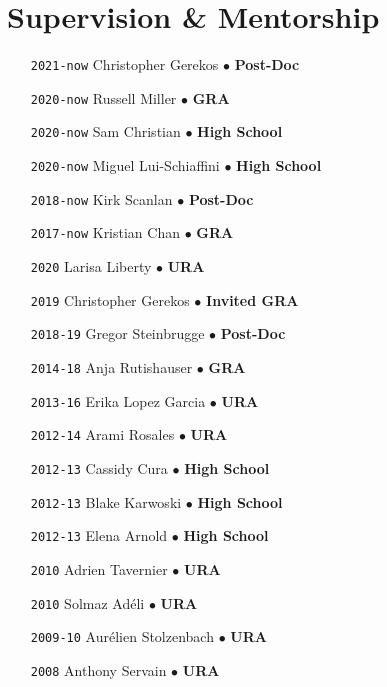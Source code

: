 \section*{Supervision \& Mentorship}

\begin{itemize}[leftmargin=5.8em, labelsep=1.5em]
\setlength\itemsep{-.5em}
    \item[\texttt{2021-now}] Christopher Gerekos $\bullet$ \textbf{Post-Doc}
    \item[\texttt{2020-now}] Russell Miller $\bullet$ \textbf{GRA}
    \item[\texttt{2020-now}] Sam Christian $\bullet$ \textbf{High School}
    \item[\texttt{2020-now}] Miguel Lui-Schiaffini $\bullet$ \textbf{High School}
    \item[\texttt{2018-now}] Kirk Scanlan $\bullet$ \textbf{Post-Doc}
    \item[\texttt{2017-now}] Kristian Chan $\bullet$ \textbf{GRA}
    \item[\texttt{2020}] Larisa Liberty $\bullet$ \textbf{URA}
    \item[\texttt{2019}] Christopher Gerekos $\bullet$ \textbf{Invited GRA}
    \item[\texttt{2018-19}] Gregor Steinbrugge $\bullet$ \textbf{Post-Doc}
    \item[\texttt{2014-18}] Anja Rutishauser $\bullet$ \textbf{GRA}
    \item[\texttt{2013-16}] Erika Lopez Garcia $\bullet$ \textbf{URA}
    \item[\texttt{2012-14}] Arami Rosales $\bullet$ \textbf{URA}
    \item[\texttt{2012-13}] Cassidy Cura $\bullet$ \textbf{High School}
    \item[\texttt{2012-13}] Blake Karwoski $\bullet$ \textbf{High School}
    \item[\texttt{2012-13}] Elena Arnold $\bullet$ \textbf{High School}
    \item[\texttt{2010}] Adrien Tavernier $\bullet$ \textbf{URA}
    \item[\texttt{2010}] Solmaz Adéli $\bullet$ \textbf{URA}
    \item[\texttt{2009-10}] Aurélien Stolzenbach $\bullet$ \textbf{URA}
    \item[\texttt{2008}] Anthony Servain $\bullet$ \textbf{URA}
\end{itemize}
